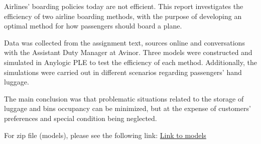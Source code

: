 Airlines' boarding policies today are not efficient. This report investigates the efficiency of two airline boarding methods, with the purpose of developing an optimal method for how passengers should board a plane. 

\indent\newline
Data was collected from the assignment text, sources online and conversations with the Assistant Duty Manager at Avinor. Three models were constructed and simulated in Anylogic PLE to test the efficiency of each method. Additionally, the simulations were carried out in different scenarios regarding passengers' hand luggage. 

\indent\newline
The main conclusion was that problematic situations related to the storage of luggage and bins occupancy can be minimized, but at the expense of customers' preferences and special condition being neglected.

\indent \newline
For zip file (models), please see the following link: \href{https://drive.google.com/drive/folders/1VZgH4s8a4-h7n55ZSne8xIgZjmSHqZp4?fbclid=IwAR2y01mujZJFVkSpYmHQiHwvKUHRrfwQyc82lElynNiwaFtOvQPyw4ZdSCk}{Link to models}